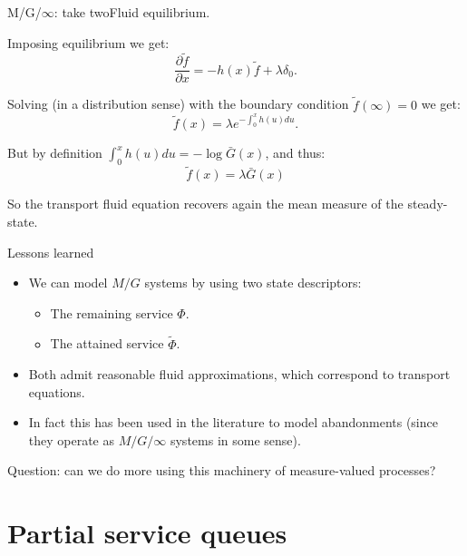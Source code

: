 \documentclass[aspectratio=169]{beamer}
\newenvironment*{myitem}[1][1.5em]{\begin{itemize}\setlength{\itemsep}{#1}}{\end{itemize}}
\begin{document}
\begin{frame}{M/G/$\infty$: take two}{Fluid equilibrium.}
	
Imposing equilibrium we get:
	\begin{equation*}
		\frac{\partial \tilde f}{\partial x} = - h(x)\tilde{f} + \lambda \delta_0.
	\end{equation*}

Solving (in a distribution sense) with the boundary condition $\tilde f (\infty) = 0$ we get:
	\begin{equation*}
		\tilde{f}(x) = \lambda e^{-\int_0^x h(u)du}.
	\end{equation*}

But by definition $\int_0^x h(u) du = -\log \bar{G}(x)$, and thus:
	\begin{equation*}
		\tilde{f}(x) = \lambda \bar{G}(x)
	\end{equation*}

So the transport fluid equation recovers again the mean measure of the steady-state.

\end{frame}

\begin{frame}{Lessons learned}

	\begin{myitem}
		\item We can model $M/G$ systems by using two state descriptors:
			\begin{itemize}
				\item The remaining service $\Phi$.
				\item The attained service $\tilde\Phi$.
			\end{itemize}
		\item Both admit reasonable fluid approximations, which correspond to transport equations.
		\item In fact this has been used in the literature to model abandonments (since they operate as $M/G/\infty$ systems in some sense).
	\end{myitem}
	\pause \vfill
	\alert{Question:} can we do more using this machinery of measure-valued processes?
\end{frame}

\section{Partial service queues}
\end{document}
